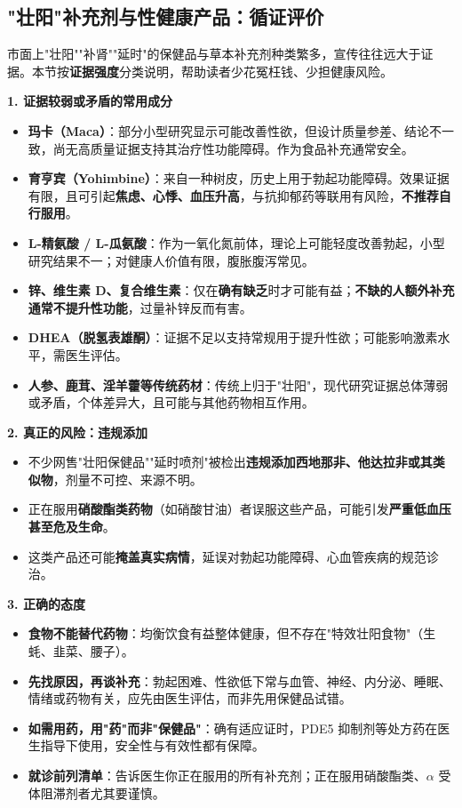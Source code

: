 \subsection{"壮阳"补充剂与性健康产品：循证评价}

市面上"壮阳""补肾""延时"的保健品与草本补充剂种类繁多，宣传往往远大于证据。本节按\textbf{证据强度}分类说明，帮助读者少花冤枉钱、少担健康风险。

\vspace{0.5em}
\noindent\textbf{1. 证据较弱或矛盾的常用成分}

\begin{itemize}
	\item \textbf{玛卡（Maca）}：部分小型研究显示可能改善性欲，但设计质量参差、结论不一致，尚无高质量证据支持其治疗性功能障碍。作为食品补充通常安全。
	\item \textbf{育亨宾（Yohimbine）}：来自一种树皮，历史上用于勃起功能障碍。效果证据有限，且可引起\textbf{焦虑、心悸、血压升高}，与抗抑郁药等联用有风险，\textbf{不推荐自行服用}。
	\item \textbf{L-精氨酸 / L-瓜氨酸}：作为一氧化氮前体，理论上可能轻度改善勃起，小型研究结果不一；对健康人价值有限，腹胀腹泻常见。
	\item \textbf{锌、维生素 D、复合维生素}：仅在\textbf{确有缺乏}时才可能有益；\textbf{不缺的人额外补充通常不提升性功能}，过量补锌反而有害。
	\item \textbf{DHEA（脱氢表雄酮）}：证据不足以支持常规用于提升性欲；可能影响激素水平，需医生评估。
	\item \textbf{人参、鹿茸、淫羊藿等传统药材}：传统上归于"壮阳"，现代研究证据总体薄弱或矛盾，个体差异大，且可能与其他药物相互作用。
\end{itemize}

\noindent\textbf{2. 真正的风险：违规添加}

\begin{itemize}
	\item 不少网售"壮阳保健品""延时喷剂"被检出\textbf{违规添加西地那非、他达拉非或其类似物}，剂量不可控、来源不明。
	\item 正在服用\textbf{硝酸酯类药物}（如硝酸甘油）者误服这些产品，可能引发\textbf{严重低血压甚至危及生命}。
	\item 这类产品还可能\textbf{掩盖真实病情}，延误对勃起功能障碍、心血管疾病的规范诊治。
\end{itemize}

\noindent\textbf{3. 正确的态度}

\begin{itemize}
	\item \textbf{食物不能替代药物}：均衡饮食有益整体健康，但不存在"特效壮阳食物"（生蚝、韭菜、腰子）。
	\item \textbf{先找原因，再谈补充}：勃起困难、性欲低下常与血管、神经、内分泌、睡眠、情绪或药物有关，应先由医生评估，而非先用保健品试错。
	\item \textbf{如需用药，用"药"而非"保健品"}：确有适应证时，PDE5 抑制剂等处方药在医生指导下使用，安全性与有效性都有保障。
	\item \textbf{就诊前列清单}：告诉医生你正在服用的所有补充剂；正在服用硝酸酯类、$\alpha$ 受体阻滞剂者尤其要谨慎。
\end{itemize}

